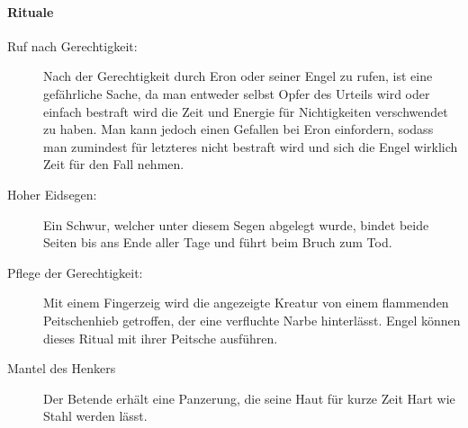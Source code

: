 \documentclass[a4paper,12pt,oneside]{book}
\begin{document}
\paragraph{Rituale}
\begin{description}
\item[Ruf nach Gerechtigkeit:]
Nach der Gerechtigkeit durch Eron oder seiner Engel zu rufen, ist eine gefährliche Sache, da man entweder selbst Opfer des Urteils wird oder einfach bestraft wird die Zeit und Energie für Nichtigkeiten verschwendet zu haben. Man kann jedoch einen Gefallen bei Eron einfordern, sodass man zumindest für letzteres nicht bestraft wird und sich die Engel wirklich Zeit für den Fall nehmen. 
\item[Hoher Eidsegen:]
Ein Schwur, welcher unter diesem Segen abgelegt wurde, bindet beide Seiten bis ans Ende aller Tage und führt beim Bruch zum Tod.
\item[Pflege der Gerechtigkeit:]
Mit einem Fingerzeig wird die angezeigte Kreatur von einem flammenden Peitschenhieb getroffen, der eine verfluchte Narbe hinterlässt. Engel können dieses Ritual mit ihrer Peitsche ausführen.
\item[Mantel des Henkers]
Der Betende erhält eine Panzerung, die seine Haut für kurze Zeit Hart wie Stahl werden lässt.
\end{description}
\end{document}
